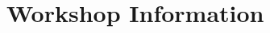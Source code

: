 \documentclass[a4paper,12pt,twoside]{memoir}
\begin{document}
%
%
\workshoptitlepage

%
%

\clearpage

\tableofcontents

\chapter{Workshop Information}
\clearpage

%
%


%
%

%
%


%
%


%
%
\end{document}
